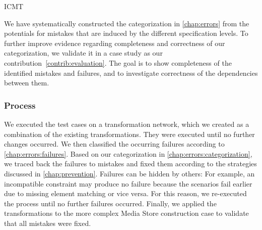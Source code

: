 \begin{copiedFrom}{ICMT}

We have systematically constructed the categorization in \autoref{chap:errors} from the potentials for mistakes that are induced by the different specification levels. %
To further improve evidence regarding completeness and correctness of %
our categorization, we validate it in a case study as our contribution~\ref{contrib:evaluation}.
The goal is 
 to show completeness of the identified mistakes and failures, and
 to investigate correctness of the dependencies between them. %


\subsubsection*{Process}
We executed the test cases on a transformation network, which we created as a combination of the existing transformations.
They were executed until no further changes occurred.
We then classified the occurring failures according to \autoref{chap:errors:failures}.
Based on our categorization in \autoref{chap:errors:categorization}, we traced back the failures to mistakes and fixed them according to the strategies discussed in \autoref{chap:prevention}.
Failures can be hidden by others: 
For example, an incompatible constraint may produce no failure because the scenarios fail earlier due to missing element matching or vice versa.
For this reason, we re-executed the process until no further failures occurred.
Finally, we applied the transformations to the more complex Media Store construction case to validate that all mistakes were fixed.


\end{copiedFrom}
